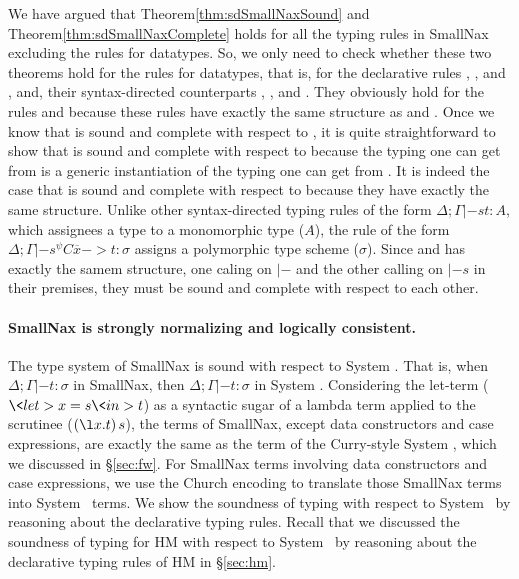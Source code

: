 We have argued that Theorem\;\ref{thm:sdSmallNaxSound} and
Theorem\;\ref{thm:sdSmallNaxComplete} holds for all the typing rules
in SmallNax excluding the rules for datatypes. So, we only need to check
whether these two theorems hold for the rules for datatypes, that is,
for the declarative rules , , and ,
and, their syntax-directed counterparts , ,
and . They obviously hold for the rules  and
 because these rules have exactly the same structure as 
 and . Once we know that  is
sound and complete with respect to , it is quite
straightforward to show that  is sound and complete
with respect to  because the typing one can get
from  is a generic instantiation of the typing
one can get from . It is indeed the case that
 is sound and complete with respect to 
because they have exactly the same structure. Unlike other syntax-directed
typing rules of the form $\Delta;\Gamma |-s t : A$, which
assignees a type to a monomorphic type ($A$), the rule 
of the form $\Delta;\Gamma |-s^\psi C\overline{x} -> t : \sigma$
assigns a polymorphic type scheme ($\sigma$). Since  and
 has exactly the samem structure, one caling on $|-$
and the other calling on $|-s$ in their premises, they must be sound
and complete with respect to each other.

\paragraph{SmallNax is strongly normalizing and logically consistent.}
The type system of SmallNax is sound with respect to System \Fw.
That is, when $\Delta;\Gamma |- t:\sigma$ in SmallNax, then 
$\Delta;\Gamma |- t:\sigma$ in System \Fw.
Considering the let-term ($\<let> x=s \<in> t$) as a syntactic sugar of
a lambda term applied to the scrutinee ($(\l x.t)\,s$), the terms of SmallNax,
except data constructors and case expressions, are exactly the same as
the term of the Curry-style System \Fw, which we discussed in \S\ref{sec:fw}.
For SmallNax terms involving data constructors and case expressions, we use
the Church encoding to translate those SmallNax terms into System \Fw\ terms.
We show the soundness of typing with respect to System \Fw\ by reasoning about
the declarative typing rules. Recall that we discussed
the soundness of typing for HM with respect to System \F\ by reasoning about
the declarative typing rules of HM in \S\ref{sec:hm}.

